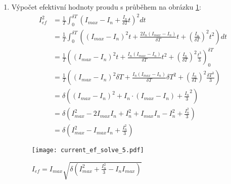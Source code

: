 \begin{enumerate}[noitemsep]
      \item Výpočet efektivní hodnoty proudu s průběhem na obrázku \ref{es:fig_current_ef_solve_5}:
         {\footnotesize
          \begin{align*}
            I_{ef}^2 
              &=  \frac{1}{T}\int_0^{\delta T}\left(I_{max}-I_n + 
                  \frac{I_n}{\delta T}t\right)^2dt                                 \\                   
              &=  \frac{1}{T}\int_0^{\delta T}\left((I_{max}-I_n)^2t + 
                  \frac{2I_n(I_{max}-I_n)}{\delta T}t +
                 (\frac{I_n}{\delta T})^2t^2\right)dt                              \\ 
              &=  \frac{1}{T}\left((I_{max}-I_n)^2t +
                  \frac{I_n(I_{max}-I_n)}{\delta T}t^2 +
                 (\frac{I_n}{\delta T})^2\frac{t^3}{3}\right)_0^{\delta T}         \\ 
              &=  \frac{1}{T}\left((I_{max}-I_n)^2\delta T +
                  \frac{I_n(I_{max}-I_n)}{\delta T}\delta T^2 + 
                 (\frac{I_n}{\delta T})^2\frac{\delta T^3}{3}\right)               \\  
              &=  \delta\left((I_{max} - I_n)^2 + I_n\cdot(I_{max}-I_n) +
                  \frac{I_n}{3}^2\right)                                           \\  
              &=  \delta\left(I_{max}^2-2I_{max}I_n+I_{n}^2 + I_{max}I_n-I_n^2 +
                  \frac{I_n^2}{3} \right)                                          \\ 
              &=  \delta\left(I_{max}^2-I_{max}I_n+\frac{I_n^2}{3}\right)
          \end{align*}
          } %
        \begin{figure}[ht!]
          \centering
          \texttt{[image: current\_ef\_solve\_5.pdf]}
          \caption{\(I_{ef}=I_{max}\sqrt{\delta\left(I_{max}^2+\frac{I_n^2}{3}- 
                   I_nI_{max}\right)}\) }
          \label{es:fig_current_ef_solve_5}
        \end{figure}        
         

\end{enumerate}
